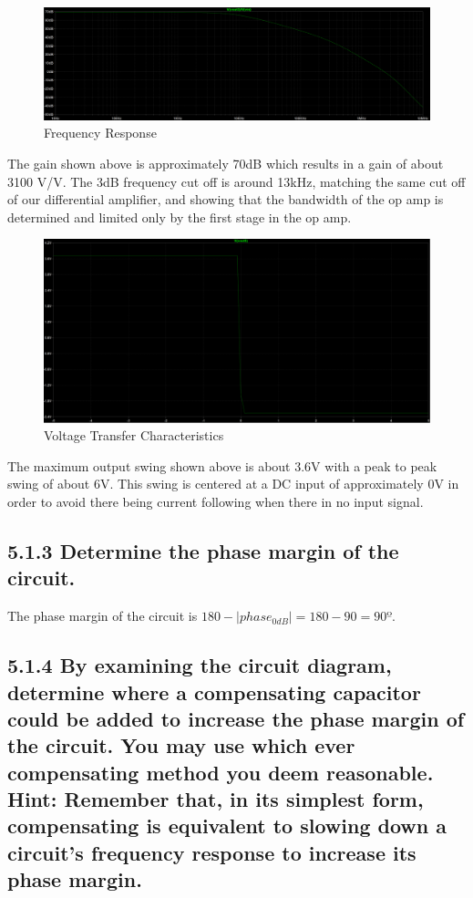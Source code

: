 \documentclass[12pt]{article}
\begin{document}
\begin{figure}[H]
    \centering
    \includegraphics[width=1.1\textwidth]{512-1.PNG}
    \caption{Frequency Response}
\end{figure}

The gain shown above is approximately 70dB which results in a gain of about 3100 V/V. The 3dB frequency cut off is around 13kHz, matching the same cut off of our differential amplifier, and showing that the bandwidth of the op amp is determined and limited only by the first stage in the op amp.


\begin{figure}[H]
    \centering
    \includegraphics[width=1.1\textwidth]{512-2.PNG}
    \caption{Voltage Transfer Characteristics}
\end{figure}

The maximum output swing shown above is about 3.6V with a peak to peak swing of about 6V. This swing is centered at a DC input of approximately 0V in order to avoid there being current following when there in no input signal.


\subsection*{5.1.3 Determine the phase margin of the circuit.}

The phase margin of the circuit is $180 - |phase_{0dB}| = 180 - 90 = 90º$.

\subsection*{5.1.4 By examining the circuit diagram, determine where a 
compensating capacitor could be added to increase the phase margin of the circuit. 
You may use which ever compensating method you deem reasonable. Hint: Remember that, 
in its simplest form, compensating is equivalent to slowing down a circuit’s frequency 
response to increase its phase margin.}
\end{document}
